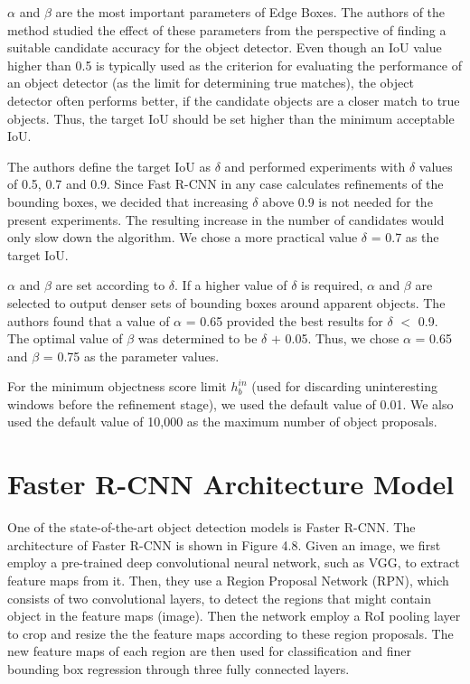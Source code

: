 $\alpha$ and $\beta$ are the most important parameters of Edge Boxes. The authors of the method studied the effect of these parameters from the perspective of finding a suitable candidate accuracy for the object detector. Even though an IoU value higher than 0.5 is typically used as the criterion for evaluating the performance of an object detector (as the limit for determining true matches), the object detector often performs better, if the candidate objects are a closer match to true objects. Thus, the target IoU should be set higher than the minimum acceptable IoU. 

The authors define the target IoU as $\delta$ and performed experiments with $\delta$ values of 0.5, 0.7 and 0.9. Since Fast R-CNN in any case calculates refinements of the bounding boxes, we decided that increasing $\delta$ above 0.9 is not needed for the present experiments. The resulting increase in the number of candidates would only slow down the algorithm. We chose a more practical value $\delta$ = 0.7 as the target IoU. 

$\alpha$ and $\beta$ are set according to $\delta$. If a higher value of $\delta$ is required, $\alpha$ and $\beta$ are selected to output denser sets of bounding boxes around apparent objects. The authors found that a value of $\alpha$ = 0.65 provided the best results for $\delta$ $<$ 0.9. The optimal value of $\beta$ was determined to be $\delta$ $+$ 0.05. Thus, we chose $\alpha$ = 0.65 and $\beta$ = 0.75 as the parameter values. 

For the minimum objectness score limit $h^{in}_{b}$ (used for discarding uninteresting windows before the refinement stage), we used the default value of 0.01. We also used the default value of 10,000 as the maximum number of object proposals.

\section{Faster R-CNN Architecture Model}

One of the state-of-the-art object detection models is Faster R-CNN. The architecture of Faster R-CNN is shown in Figure 4.8. Given an image, we first employ a pre-trained deep convolutional neural network, such as VGG, to extract feature maps from it. Then, they use a Region Proposal Network (RPN), which consists of two convolutional layers, to detect the regions that might contain object in the feature maps (image). Then the network employ a RoI pooling layer to crop and resize the the feature maps according to these region proposals. The new feature maps of each region are then used for classification and finer bounding box regression through three fully connected layers.

